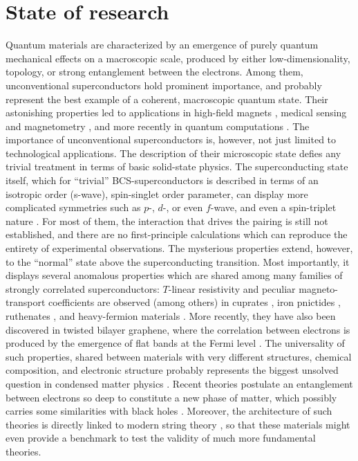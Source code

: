 \documentclass[a4paper, 12pt]{article}
\begin{document}
\section{State of research}
Quantum materials are characterized by an emergence of purely quantum mechanical effects on a macroscopic scale, produced by either low-dimensionality, topology, or strong entanglement between the electrons. Among them, unconventional superconductors hold prominent importance, and probably represent the best example of a coherent, macroscopic quantum state. Their astonishing properties led to applications in high-field magnets \cite{weijers2010high}, medical sensing \cite{iwasa2010high} and magnetometry \cite{clarke2004squid}, and more recently in quantum computations \cite{ladd2010quantum}.
The importance of unconventional superconductors is, however, not just limited to technological applications. The description of their microscopic state defies any trivial treatment in terms of basic solid-state physics. 
The superconducting state itself, which for “trivial” BCS-superconductors is described in terms of an isotropic order (s-wave), spin-singlet order parameter, can display more complicated symmetries such as $p$-, $d$-, or even $f$-wave, and even a spin-triplet nature \cite{ran2019nearly}. 
For most of them, the interaction that drives the pairing is still not established, and there are no first-principle calculations which can reproduce the entirety of experimental observations.
The mysterious properties extend, however, to the ``normal'' state above the superconducting transition. 
Most importantly, it displays several anomalous properties which are shared among many families of strongly correlated superconductors: $T$-linear resistivity and peculiar magneto-transport coefficients are observed (among others) in cuprates \cite{cooper2009anomalous, jin2011link, chien1991effect}, iron pnictides \cite{licciardello2019electrical}, ruthenates \cite{bruin2013similarity}, and heavy-fermion materials \cite{lai2022electronic, paschen2004hall}. More recently, they have also been discovered in twisted bilayer graphene, where the correlation between electrons is produced by the emergence of flat bands at the Fermi level \cite{polshyn2019large}.
The universality of such properties, shared between materials with very different structures, chemical composition, and electronic structure probably represents the biggest unsolved question in condensed matter physics \cite{phillips2022stranger}.
Recent theories postulate an entanglement between electrons so deep to constitute a new phase of matter, which possibly carries some similarities with black holes \cite{zaanen2019planckian, zaanen2021lectures, PhysRevD.105.L021901}. Moreover, the architecture of such theories is directly linked to modern string theory \cite{cubrovic2009string}, so that these materials might even provide a benchmark to test the validity of much more fundamental theories.
\end{document}
